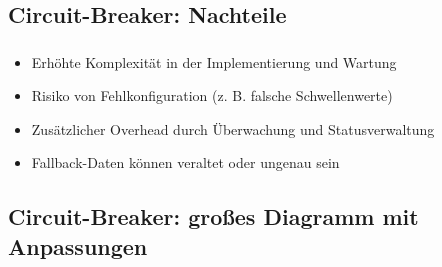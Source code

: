 \subsection{Circuit-Breaker: Nachteile}
\begin{frame}
    \frametitle{\insertsection}
    \framesubtitle{\insertsubsection}

    \begin{itemize}
        \item Erhöhte Komplexität in der Implementierung und Wartung
        \item Risiko von Fehlkonfiguration (z. B. falsche Schwellenwerte)
        \item Zusätzlicher Overhead durch Überwachung und Statusverwaltung
        \item Fallback-Daten können veraltet oder ungenau sein
    \end{itemize}
\end{frame}

\subsection{Circuit-Breaker: großes Diagramm mit Anpassungen}
\begin{frame}
    \frametitle{\insertsection}
    \framesubtitle{\insertsubsection}

\end{frame}



